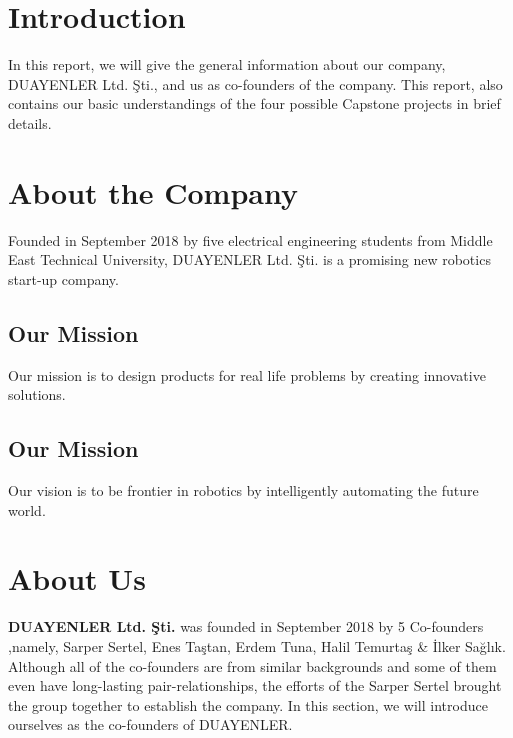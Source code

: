 \documentclass[a4paper,12pt]{article}
\newcommand{\blankpage}{
	\- \\[9cm]	
	{ \centering \textit{This page intentionally left blank.} \par }
	\- \\[9cm]
}%
\begin{document}
\tableofcontents
\newpage


\section{Introduction}
	In this report, we will give the general information about our company, DUAYENLER Ltd. Şti., and us as co-founders of the company. This report, also contains our basic understandings of the four possible Capstone projects in brief details.
	
\section{About the Company}
	Founded in September 2018 by five electrical engineering students from Middle East Technical University, DUAYENLER Ltd. Şti. is a promising new robotics start-up company.

\subsection{Our Mission}
	Our mission is to design products for real life problems by creating innovative solutions.
	
\subsection{Our Mission}
	Our vision is to be frontier in robotics by intelligently automating the future world.

\section{About Us}
	\textbf{DUAYENLER Ltd. Şti.} was founded in September 2018 by 5 Co-founders ,namely, Sarper Sertel, Enes Taştan, Erdem Tuna, Halil Temurtaş \& İlker Sağlık.   Although all of the co-founders are from similar backgrounds and some of them even have long-lasting pair-relationships, the efforts of the Sarper Sertel brought  the group together to establish the company.  In this section, we will introduce ourselves as the co-founders of DUAYENLER. \\%

%
\end{document}
